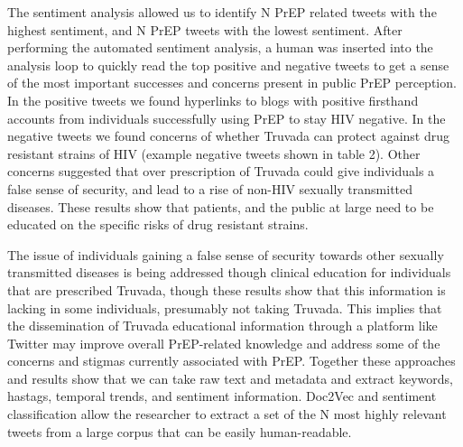 The sentiment analysis allowed us to identify N PrEP related tweets with the highest sentiment, and N PrEP tweets with the lowest sentiment. After performing the automated sentiment analysis, a human was inserted into the analysis loop to quickly read the top positive and negative tweets to get a sense of the most important successes and concerns present in public PrEP perception. In the positive tweets we found hyperlinks to blogs with positive firsthand accounts from individuals successfully using PrEP to stay HIV negative. In the negative tweets we found concerns of whether Truvada can protect against drug resistant strains of HIV (example negative tweets shown in table 2). Other concerns suggested that over prescription of Truvada could give individuals a false sense of security, and lead to a rise of non-HIV sexually transmitted diseases. These results show that patients, and the public at large need to be educated on the specific risks of drug resistant strains.

The issue of individuals gaining a false sense of security towards other sexually transmitted diseases is being addressed though clinical education for individuals that are prescribed Truvada, though these results show that this information is lacking in some individuals, presumably not taking Truvada. This implies that the dissemination of Truvada educational information through a platform like Twitter may improve overall PrEP-related knowledge and address some of the concerns and stigmas currently associated with PrEP. Together these approaches and results show that we can take raw text and metadata and extract keywords, hastags, temporal trends, and sentiment information. Doc2Vec and sentiment classification allow the researcher to extract a set of the N most highly relevant tweets from a large corpus that can be easily human-readable.

